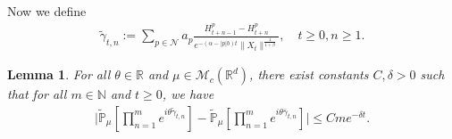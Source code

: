 \documentclass[12pt,a4paper]{amsart}
\theoremstyle{plain}
\newtheorem{lem}[thm]{Lemma}
\theoremstyle{definition}
\numberwithin{equation}{section}
\begin{document}
    Now we define
\begin{align}
    \widetilde{\gamma}_{t,n}
    :=\sum_{p\in \mathcal{N}}a_p\frac{H^p_{t+n-1}-H^p_{t+n}}{e^{-(\alpha-|p|b)t}\|X_{t}\|^{\frac{1}{1+\beta}}},
    \quad t\geq 0, n\geq 1.
\end{align}
\begin{lem}\label{lem: lemma04}
    For all $\theta\in \mathbb{R}$ and $\mu\in \mathcal{M}_c(\mathbb{R}^d)$, there exist constants $C,\delta>0$ such that for all $m\in \mathbb{N}$ and $t\geq 0$, we have
\begin{align}
    \Big|\widetilde{\mathbb{P}}_{\mu}[\prod_{n=1}^m e^{i\theta \widetilde{\gamma}_{t,n}}]-\widetilde{\mathbb{P}}_{\mu}[\prod_{n=1}^me^{i\theta \bar{\gamma}_{t,n}}]\Big|
    \leq C m e^{-\delta t}.
\end{align}
\end{lem}
\end{document}
